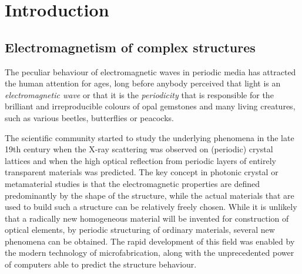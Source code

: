 \section{Introduction} %

\subsection{Electromagnetism of complex structures} %
The peculiar behaviour of electromagnetic waves in periodic media has attracted the human attention for ages, long before anybody perceived that light is an \textit{electromagnetic wave} or that it is the \textit{periodicity} that is responsible for the brilliant and irreproducible colours of opal gemstones and many living creatures, such as various beetles, butterflies or peacocks. 

The scientific community started to study the underlying phenomena in the late 19th century when the X-ray scattering was observed on (periodic) crystal lattices and when the high optical reflection from periodic layers of entirely transparent materials was predicted. %
The key concept in photonic crystal or metamaterial studies is that the electromagnetic properties are defined predominantly by the shape of the structure, while the actual materials that are used to build such a structure can be relatively freely chosen. %
While it is unlikely that a radically new homogeneous material will be invented for construction of optical elements, by periodic structuring of ordinary materials, several new phenomena can be obtained. The rapid development of this field was enabled by the modern technology of microfabrication, along with the unprecedented power of computers able to predict the structure behaviour.

